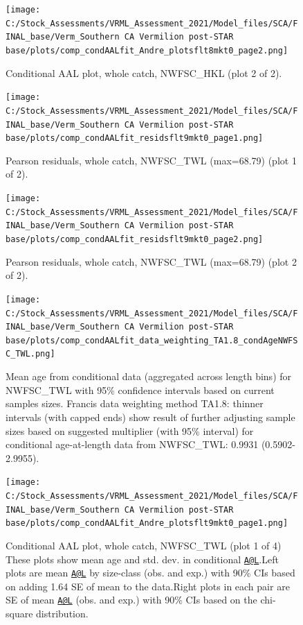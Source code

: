 \documentclass[11pt,
  english,
]{article}
\begin{document}
\begin{figure}
\centering
\texttt{[image: C:/Stock\_Assessments/VRML\_Assessment\_2021/Model\_files/SCA/FINAL\_base/Verm\_Southern CA Vermilion post-STAR base/plots/comp\_condAALfit\_Andre\_plotsflt8mkt0\_page2.png]}
\caption{Conditional AAL plot, whole catch, NWFSC\_HKL (plot 2 of 2).\label{fig:comp_condAALfit_Andre_plotsflt8mkt0_page2}}
\end{figure}

\begin{figure}
\centering
\texttt{[image: C:/Stock\_Assessments/VRML\_Assessment\_2021/Model\_files/SCA/FINAL\_base/Verm\_Southern CA Vermilion post-STAR base/plots/comp\_condAALfit\_residsflt9mkt0\_page1.png]}
\caption{Pearson residuals, whole catch, NWFSC\_TWL (max=68.79) (plot 1 of 2).\label{fig:comp_condAALfit_residsflt9mkt0_page1}}
\end{figure}

\begin{figure}
\centering
\texttt{[image: C:/Stock\_Assessments/VRML\_Assessment\_2021/Model\_files/SCA/FINAL\_base/Verm\_Southern CA Vermilion post-STAR base/plots/comp\_condAALfit\_residsflt9mkt0\_page2.png]}
\caption{Pearson residuals, whole catch, NWFSC\_TWL (max=68.79) (plot 2 of 2).\label{fig:comp_condAALfit_residsflt9mkt0_page2}}
\end{figure}

\begin{figure}
\centering
\texttt{[image: C:/Stock\_Assessments/VRML\_Assessment\_2021/Model\_files/SCA/FINAL\_base/Verm\_Southern CA Vermilion post-STAR base/plots/comp\_condAALfit\_data\_weighting\_TA1.8\_condAgeNWFSC\_TWL.png]}
\caption{Mean age from conditional data (aggregated across length bins) for NWFSC\_TWL with 95\% confidence intervals based on current samples sizes. Francis data weighting method TA1.8: thinner intervals (with capped ends) show result of further adjusting sample sizes based on suggested multiplier (with 95\% interval) for conditional age-at-length data from NWFSC\_TWL: 0.9931 (0.5902-2.9955).\label{fig:comp_condAALfit_data_weighting_TA1.8_condAgeNWFSC_TWL}}
\end{figure}

\begin{figure}
\centering
\texttt{[image: C:/Stock\_Assessments/VRML\_Assessment\_2021/Model\_files/SCA/FINAL\_base/Verm\_Southern CA Vermilion post-STAR base/plots/comp\_condAALfit\_Andre\_plotsflt9mkt0\_page1.png]}
\caption{Conditional AAL plot, whole catch, NWFSC\_TWL (plot 1 of 4) These plots show mean age and std. dev. in conditional {\href{mailto:A@L}{\nolinkurl{A@L}}\leavevmode\tagmcend\tagstructend}.Left plots are mean {\href{mailto:A@L}{\nolinkurl{A@L}}\leavevmode\tagmcend\tagstructend} by size-class (obs. and exp.) with 90\% CIs based on adding 1.64 SE of mean to the data.Right plots in each pair are SE of mean {\href{mailto:A@L}{\nolinkurl{A@L}}\leavevmode\tagmcend\tagstructend} (obs. and exp.) with 90\% CIs based on the chi-square distribution.\label{fig:comp_condAALfit_Andre_plotsflt9mkt0_page1}}
\end{figure}
\end{document}
